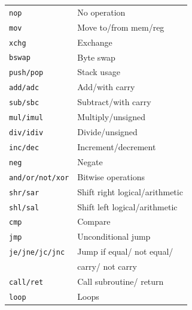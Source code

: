 \documentclass[a4paper,11pt]{article}
\begin{document}
\begin{tabular}{l l}
{\tt nop} & No operation\\
{\tt mov} & Move to/from mem/reg\\
{\tt xchg} & Exchange\\
{\tt bswap} & Byte swap\\
{\tt push/pop} & Stack usage\\
{\tt add/adc} & Add/with carry\\
{\tt sub/sbc} & Subtract/with carry\\
{\tt mul/imul} & Multiply/unsigned\\
{\tt div/idiv} & Divide/unsigned\\
{\tt inc/dec} & Increment/decrement\\
{\tt neg} & Negate\\
{\tt and/or/not/xor} & Bitwise operations\\
{\tt shr/sar} & Shift right logical/arithmetic\\
{\tt shl/sal} & Shift left logical/arithmetic\\
{\tt cmp} & Compare\\
{\tt jmp} & Unconditional jump\\
{\tt je/jne/jc/jnc} & Jump if equal/ not equal/
\\&carry/ not carry\\
{\tt call/ret} & Call subroutine/ return\\
{\tt loop} & Loops\\
\end{tabular}
\end{document}

